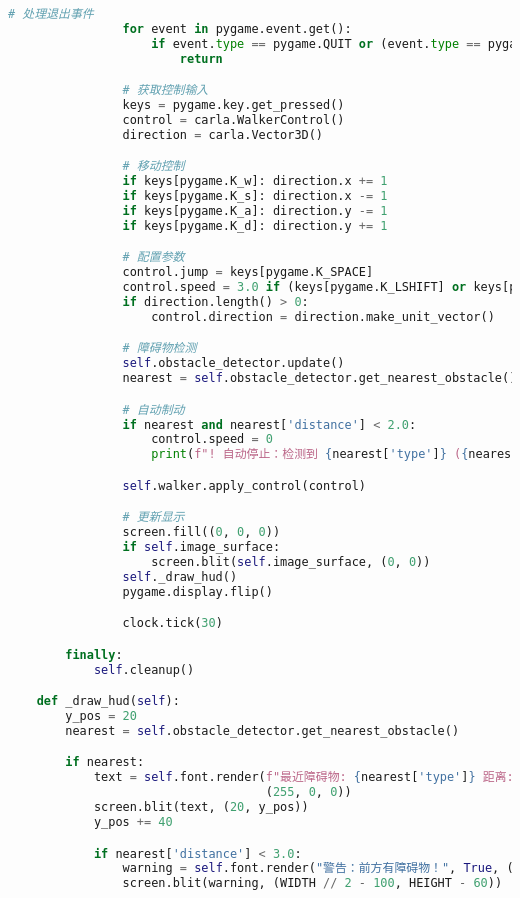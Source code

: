 \begin{lstlisting}[language=Python]
                # 处理退出事件
                for event in pygame.event.get():
                    if event.type == pygame.QUIT or (event.type == pygame.KEYDOWN and event.key == pygame.K_ESCAPE):
                        return

                # 获取控制输入
                keys = pygame.key.get_pressed()
                control = carla.WalkerControl()
                direction = carla.Vector3D()

                # 移动控制
                if keys[pygame.K_w]: direction.x += 1
                if keys[pygame.K_s]: direction.x -= 1
                if keys[pygame.K_a]: direction.y -= 1
                if keys[pygame.K_d]: direction.y += 1

                # 配置参数
                control.jump = keys[pygame.K_SPACE]
                control.speed = 3.0 if (keys[pygame.K_LSHIFT] or keys[pygame.K_RSHIFT]) else 1.5
                if direction.length() > 0:
                    control.direction = direction.make_unit_vector()

                # 障碍物检测
                self.obstacle_detector.update()
                nearest = self.obstacle_detector.get_nearest_obstacle()

                # 自动制动
                if nearest and nearest['distance'] < 2.0:
                    control.speed = 0
                    print(f"! 自动停止：检测到 {nearest['type']} ({nearest['distance']:.1f}m)")

                self.walker.apply_control(control)

                # 更新显示
                screen.fill((0, 0, 0))
                if self.image_surface:
                    screen.blit(self.image_surface, (0, 0))
                self._draw_hud()
                pygame.display.flip()

                clock.tick(30)

        finally:
            self.cleanup()

    def _draw_hud(self):
        y_pos = 20
        nearest = self.obstacle_detector.get_nearest_obstacle()

        if nearest:
            text = self.font.render(f"最近障碍物: {nearest['type']} 距离: {nearest['distance']:.2f}m", True,
                                    (255, 0, 0))
            screen.blit(text, (20, y_pos))
            y_pos += 40

            if nearest['distance'] < 3.0:
                warning = self.font.render("警告：前方有障碍物！", True, (255, 0, 0))
                screen.blit(warning, (WIDTH // 2 - 100, HEIGHT - 60))


\end{lstlisting}
